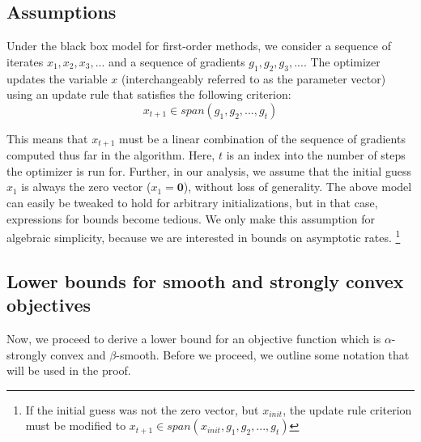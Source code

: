 \documentclass{article}
\begin{document}
\subsection{Assumptions}

Under the black box model for first-order methods, we consider a sequence of iterates $x_1, x_2, x_3, ...$ and a sequence of gradients $g_1, g_2, g_3, ...$. The optimizer updates the variable $x$ (interchangeably referred to as the parameter vector) using an update rule that satisfies the following criterion:
\begin{equation*}
    x_{t+1} \in span\left( g_1, g_2, ..., g_t \right)
\end{equation*}

This means that $x_{t+1}$ must be a linear combination of the sequence of gradients computed thus far in the algorithm. Here, $t$ is an index into the number of steps the optimizer is run for. Further, in our analysis, we assume that the initial guess $x_1$ is always the zero vector ($x_1 = \mathbf{0}$), without loss of generality. The above model can easily be tweaked to hold for arbitrary initializations, but in that case, expressions for bounds become tedious. We only make this assumption for algebraic simplicity, because we are interested in bounds on asymptotic rates. \footnote{If the initial guess was not the zero vector, but $x_{init}$, the update rule criterion must be modified to $x_{t+1} \in span\left( x_{init}, g_1, g_2, ..., g_t \right)$}

\subsection{Lower bounds for smooth and strongly convex objectives}

Now, we proceed to derive a lower bound for an objective function which is $\alpha$-strongly convex and $\beta$-smooth. Before we proceed, we outline some notation that will be used in the proof. \\

\end{document}
